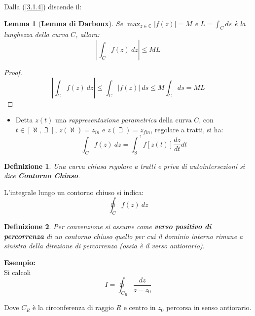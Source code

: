 \documentclass[twoside]{article}
\newtheorem{definition}{Definizione}[section]
\newtheorem{lemma}[theorem]{Lemma}
\begin{document}
Dalla (\ref{3.1.4}) discende il:
\begin{lemma}[\textbf{Lemma di Darboux}]\label{4 Darboux}
\label{Darboux}
Se $\max_{z \in \mathds{C}}|f(z)|=M$ e $L=\int_C ds$ è la lunghezza della curva $C$, allora:
\begin{equation}
    \left|\int_C f(z) \ dz \right|\leq ML
\end{equation}
\end{lemma}

\begin{proof}
\begin{equation}
    \left|\int_C f(z) \ dz\right| \leq \int_C |f(z)| \ ds \leq M \int_C ds = ML
\end{equation}
\end{proof}

\begin{itemize}
    \item Detta $z(t)$ una \textit{rappresentazione parametrica} della curva $C$, con $t\in [\aleph,\beth]$, $z(\aleph)=z_{in}$ e $z(\beth)=z_{fin}$, regolare a tratti, si ha:
    \begin{equation}
        \int_C f(z) \ dz=\int_{\aleph} ^{\beth} f[z(t)]\frac{dz}{dt} dt
    \end{equation}
\end{itemize}

\begin{definition} Una curva chiusa regolare a tratti e priva di autointersezioni si dice \textbf{Contorno Chiuso}.
\end{definition}
L'integrale lungo un contorno chiuso si indica:
\begin{equation}
    \oint_C f(z) \ dz
\end{equation}

\begin{definition} Per convenzione si assume come \textbf{verso positivo di percorrenza} di un contorno chiuso quello per cui il dominio interno rimane a sinistra della direzione di percorrenza (ossia è il verso antiorario).
\end{definition}

\textbf{Esempio:}
\\
Si calcoli
\begin{equation} \label{3.1.10}
    I=\oint_{C_R}\frac{dz}{z-z_0}
\end{equation}

Dove $C_R$ è la circonferenza di raggio $R$ e centro in $z_0$ percorsa in senso antiorario.
\end{document}
